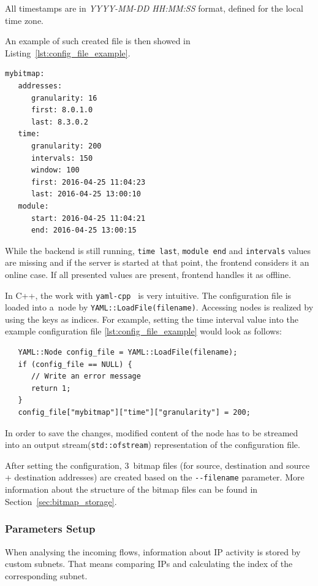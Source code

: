 All timestamps are in \textit{YYYY-MM-DD HH:MM:SS} format, defined for the local time zone.

An example of such created file is then showed in Listing~\ref{lst:config_file_example}.

\begin{lstlisting}[label={lst:config_file_example},captionpos=b,caption={Configuration File Example}]
mybitmap:
   addresses:
      granularity: 16
      first: 8.0.1.0
      last: 8.3.0.2
   time:
      granularity: 200
      intervals: 150
      window: 100
      first: 2016-04-25 11:04:23
      last: 2016-04-25 13:00:10
   module:
      start: 2016-04-25 11:04:21
      end: 2016-04-25 13:00:15
\end{lstlisting}

While the backend is still running, \texttt{time last}, \texttt{module end} and \texttt{intervals}
values are missing and if the server is started at that point, the frontend considers it an online case.
If all presented values are present, frontend handles it as offline. 

In C++, the work with \texttt{yaml-cpp}~\cite{yaml_cpp} is very intuitive.
The configuration file is loaded into a~node by \texttt{YAML::LoadFile(filename)}.
Accessing nodes is realized by using the keys as indices. For example,
setting the time interval value into the example configuration file
\ref{lst:config_file_example} would look as follows:

\begin{lstlisting}
   YAML::Node config_file = YAML::LoadFile(filename);
   if (config_file == NULL) {
      // Write an error message
      return 1;
   }
   config_file["mybitmap"]["time"]["granularity"] = 200;
\end{lstlisting}

In order to save the changes, modified content of the node has to be streamed into an output stream(\texttt{std::ofstream})
representation of the configuration file.

After setting the configuration, 3\ bitmap files (for source, destination and source + destination addresses)
are created based on the \texttt{-{}-filename} parameter. More information about
the structure of the bitmap files can be found in Section~\ref{sec:bitmap_storage}.

\subsubsection{Parameters Setup}
When analysing the incoming flows, information about IP activity is stored by custom subnets.
That means comparing IPs and calculating the index of the corresponding subnet.

